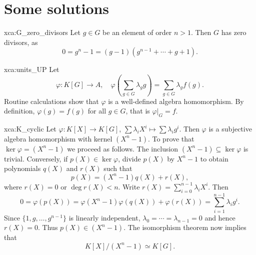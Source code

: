 \chapter*{Some solutions}



\begin{sol}{xca:G_zero_divisors}
    Let $g\in G$ be an element of order $n>1$.  
    Then $G$ has zero divisors, as 
    \[
    0=g^n-1=(g-1)(g^{n-1}+\cdots+g+1).
    \]
\end{sol}

\begin{sol}{xca:units_UP}
    Let 
    \[
    \varphi\colon K[G]\to A,\quad  
    \varphi\left(\sum_{g\in G}\lambda_gg\right)=\sum_{g\in G}\lambda_gf(g).
    \]
    Routine calculations show that $\varphi$ is a well-defined
    algebra homomorphism. By definition, $\varphi(g)=f(g)$ for all $g\in G$, that is $\varphi|_G=f$. 
\end{sol}

\begin{sol}{xca:K_cyclic}
    Let $\varphi\colon K[X]\to K[G]$, $\sum\lambda_iX^i\mapsto \sum\lambda_ig^i$. Then 
    $\varphi$ is a subjective 
    algebra homomorphism with kernel $(X^n-1)$. To prove that 
    $\ker\varphi=(X^n-1)$ we proceed as follows. The inclusion 
    $(X^n-1)\subseteq\ker\varphi$ is trivial. Conversely, 
    if $p(X)\in\ker\varphi$, divide $p(X)$ by 
    $X^n-1$ to obtain polynomials $q(X)$ and $r(X)$ such that
    \[
    p(X)=(X^n-1)q(X)+r(X),
    \]
    where $r(X)=0$ or $\deg r(X)<n$. Write $r(X)=\sum_{i=0}^{n-1}\lambda_iX^i$. 
    Then
    \[
    0=\varphi(p(X))=\varphi(X^n-1)\varphi(q(X))+\varphi(r(X))
    =\sum_{i=1}^{n-1}\lambda_ig^i.
    \]
    Since $\{1,g,\dots,g^{n-1}\}$ is linearly independent, 
    $\lambda_0=\cdots=\lambda_{n-1}=0$ and hence $r(X)=0$. 
    Thus $p(X)\in (X^n-1)$. The isomorphism theorem 
    now implies that 
    \[
    K[X]/(X^n-1)\simeq K[G].
    \]
\end{sol}

